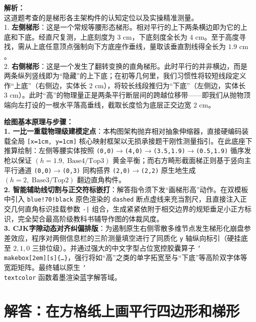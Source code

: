 \documentclass[12pt, a4paper]{ctexrep}
\begin{document}
{\small\color{gray}
\textbf{解析：}\\
这道题考查的是梯形各主架构件的认知定位以及实操精准测量。\\
1. \textbf{左侧梯形}：这是一个常规等腰形态梯形。相对平行的上下两条横边即为它的上底和下底。经直尺复测，上底刻度为 $3\text{ cm}$，下底刻度全长为 $4\text{ cm}$。至于高度寻找，需从上底任意顶点强制向下方底座作垂线，量取该垂直割线得全长为 $1.9\text{ cm}$。\\
2. \textbf{右侧梯形}：这是一个发生了翻转变换的直角梯形。此时平行的并非横边，而是两条纵列竖线即为“隐藏”的上下底；在初等几何里，我们习惯性将较短线段定义作“上底”（右侧边，实体长 $2\text{ cm}$），将较长线段推归为“下底”（左侧边，实体长 $3\text{ cm}$）。此时“高”的物理量正是两条平行断层间的跨越位移带——即我们从抛物顶端向左打设的一根水平落高垂线，截取长度恰为底层正交边宽 $2\text{ cm}$。
}

\vspace{0.6cm}

{\small\color{blue!70!black}
\textbf{绘图基本原理与步骤：}\\
\textbf{1. 一比一重载物理级建模定点}：本构图架构抛弃相对抽象伸缩器，直接硬编码装载全局 \texttt{[x=1cm, y=1cm]} 核心映射框架以无损承接题干刚性测量指引。在此底座下推算绘制：左侧等腰实体按照 \texttt{(0,0)$\to$(4,0)$\to$(3.5,1.9)$\to$(0.5,1.9)} 循序发枪以保证 $(h{=}1.9,\; \text{Base}4 / \text{Top}3)$ 黄金平衡；而右方畸形截面梯正则基于竖向主平行通道 \texttt{(0,0)$\to$(0,3)} 同构搭界 \texttt{(2,0)$\to$(2,2)} 原生地生成 $(h{=}2,\; \text{Base}3 / \text{Top}2)$ 翻边直角构件。\\
\textbf{2. 智能辅助线切割与正交符标嵌打}：解答指令须下发“画梯形高”动作。在双模板中引入 \texttt{blue!70!black} 原色渲染的 \texttt{dashed} 断点虚线来充当割尺，且直接注入正交几何直角标识挂载参数 \texttt{-|} 组合，生成紧紧依附于相交边界的规矩垂足小正方标识，完全契合最高阶级教科书辅导作图的体裁风度。\\
\textbf{3. CJK字隙动态对齐纠偏排版}：为遏制原生右侧零散多维节点发生梯形化崩盘参差效应，程序对两侧信息栏的三阶测量填空进行了同质化 \texttt{y} 轴纵向标引（硬挂底至 $2, 1, 0$ 三排位级）。并通过强大的中文字型占位宽控胶囊算子 \texttt{\char`\\makebox[2em][s]\{\dots\}}，强行将如“高”之类的单字拓宽至与“下底”等高阶双字体等宽距矩阵。最终辅以原生 \texttt{\char`\\textcolor} 函数着墨渲染蓝字解答域。
}


\newpage

\section{解答：在方格纸上画平行四边形和梯形}
\end{document}
